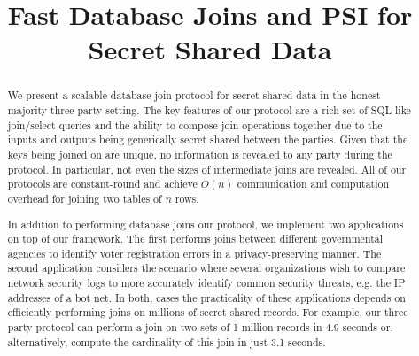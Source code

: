 \documentclass[11pt,letterpaper]{article}
\begin{document}
\title{Fast Database Joins and PSI for Secret Shared Data}
\begin{abstract}
We present a scalable database join protocol for secret shared data in the honest majority three party setting. The key features of our protocol are a rich set of SQL-like join/select queries and the ability to compose join operations together due to the inputs and outputs being generically secret shared between the parties. Given that the keys being joined on are unique, no information is revealed to any party during the protocol. In particular, not even the sizes of intermediate joins are revealed. All of our protocols are constant-round and achieve $O(n)$ communication and computation overhead for joining two tables of $n$ rows. 

In addition to performing database joins our protocol, we implement two applications on top of our framework. The first performs joins between different governmental agencies to identify voter registration errors in a privacy-preserving manner. The second application considers the scenario where several organizations wish to compare network security logs to more accurately identify common security threats, e.g. the IP addresses of a bot net. In both, cases the practicality of these applications depends on efficiently performing joins on millions of secret shared records. For example, our three party protocol can perform a join on two sets of 1 million records in 4.9 seconds or, alternatively, compute the cardinality of this join in just 3.1 seconds. 
\end{abstract}

\iffullversion
\else
\maketitle
\fi






%











\appendix
\iffullversion
\else



\fi
\end{document}
